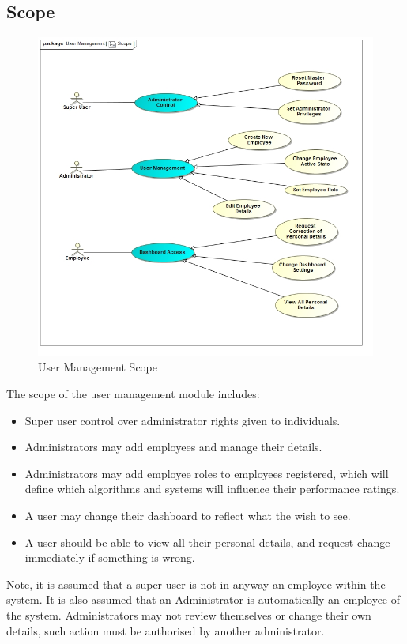 \documentclass[11pt,a4paper]{article}
\begin{document}
\subsection{Scope}
\begin{figure}[H]
	\begin{center}
		\includegraphics[scale=0.6]{../Images/User_Management_Scope.jpg}
		\caption{User Management Scope}
	\end{center}
\end{figure}

\pagebreak

The scope of the user management module includes:
\begin{itemize}
	\item Super user control over administrator rights given to individuals.
	\item Administrators may add employees and manage their details.
	\item Administrators may add employee roles to employees registered, which will define which algorithms and systems will influence their performance ratings.
	\item A user may change their dashboard to reflect what the wish to see.
	\item A user should be able to view all their personal details, and request change immediately if something is wrong. 
\end{itemize}
Note, it is assumed that a super user is not in anyway an employee within the system. It is also assumed that an Administrator is automatically an employee of the system. Administrators may not review themselves or change their own details, such action must be authorised by another administrator.
\end{document}
